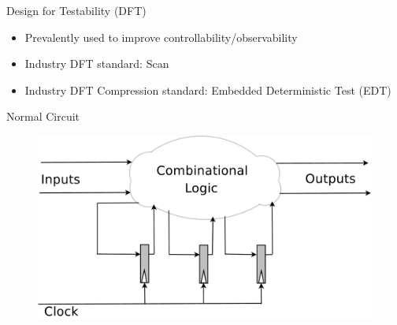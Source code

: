 \begin{frame}{Design for Testability (DFT)}
\begin{itemize}
\item Prevalently used to improve controllability/observability 
\item Industry DFT standard: Scan
\item Industry DFT Compression standard: Embedded Deterministic Test (EDT)
\end{itemize}
\end{frame}

\begin{frame}{Normal Circuit}
\begin{figure}
\begin{center}
\label{fig:scan-insertion}
\includegraphics[scale=0.2]{fig/normal_circuit.pdf}
\end{center}
\end{figure}
\end{frame}

